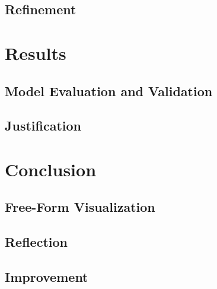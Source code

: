 \documentclass[a4paper]{article}
\begin{document}
\subsection{Refinement}

\section{Results}

\subsection{Model Evaluation and Validation}

\subsection{Justification}

\section{Conclusion}

\subsection{Free-Form Visualization}

\subsection{Reflection}

\subsection{Improvement}
\end{document}

